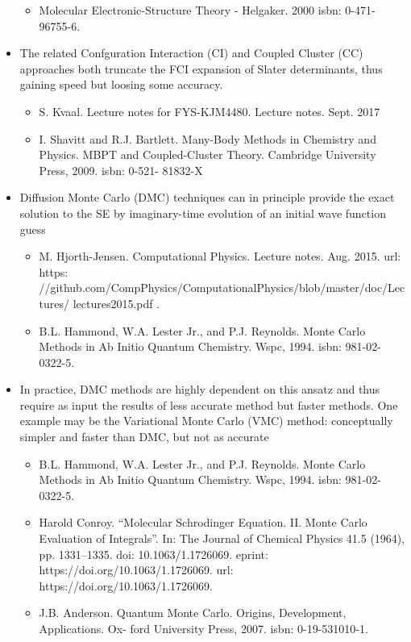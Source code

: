\documentclass[twoside,english]{uiofysmaster}
\begin{document}
\begin{itemize}
	\begin{itemize}
		\item Molecular Electronic-Structure Theory - Helgaker. 2000 isbn: 0-471-96755-6.
	\end{itemize}
	\item The related Confguration Interaction (CI) and Coupled Cluster (CC) approaches both truncate the FCI expansion of Slater determinants, thus gaining speed but loosing some accuracy.
	\begin{itemize}
		\item S. Kvaal. Lecture notes for FYS-KJM4480. Lecture notes. Sept. 2017
		\item I. Shavitt and R.J. Bartlett. Many-Body Methods in Chemistry and Physics. MBPT and Coupled-Cluster Theory. Cambridge University Press, 2009. isbn: 0-521- 81832-X
	\end{itemize}
	\item Diffusion Monte Carlo (DMC) techniques can in principle provide the exact solution to the SE by imaginary-time evolution of an initial wave function guess
	\begin{itemize}
		\item M. Hjorth-Jensen. Computational Physics. Lecture notes. Aug. 2015. url: https: //github.com/CompPhysics/ComputationalPhysics/blob/master/doc/Lectures/ lectures2015.pdf .
		\item B.L. Hammond, W.A. Lester Jr., and P.J. Reynolds. Monte Carlo Methods in Ab Initio Quantum Chemistry. Wspc, 1994. isbn: 981-02-0322-5.
	\end{itemize}
	\item In practice, DMC methods are highly dependent on this ansatz and thus require as input the results of less accurate method but faster methods. One example may be the Variational Monte Carlo (VMC) method: conceptually simpler and faster than DMC, but not as accurate
	\begin{itemize}
		\item B.L. Hammond, W.A. Lester Jr., and P.J. Reynolds. Monte Carlo Methods in Ab Initio Quantum Chemistry. Wspc, 1994. isbn: 981-02-0322-5.
		\item Harold Conroy. “Molecular Schrodinger Equation. II. Monte Carlo Evaluation of Integrals”. In: The Journal of Chemical Physics 41.5 (1964), pp. 1331–1335. doi: 10.1063/1.1726069. eprint: https://doi.org/10.1063/1.1726069. url: https://doi.org/10.1063/1.1726069.
		\item J.B. Anderson. Quantum Monte Carlo. Origins, Development, Applications. Ox- ford University Press, 2007. isbn: 0-19-531010-1.

\end{itemize}
\end{itemize}
\end{document}
